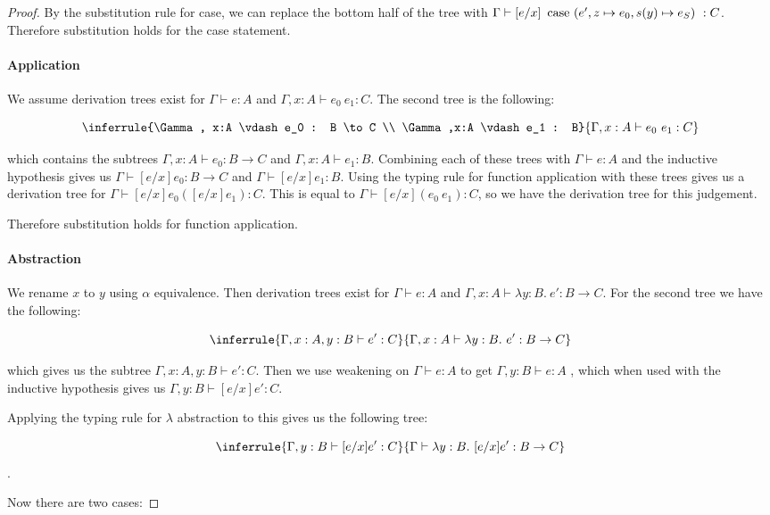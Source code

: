 \begin{proof}
By the substitution rule for case, we can replace the bottom half of the tree with $\Gamma \vdash [e/x] \ \operatorname{case} \ (e', z \mapsto e_0 , s(y) \mapsto e_S) \  : C$. Therefore substitution holds for the case statement. 

\paragraph{Application} We assume derivation trees exist for $\Gamma \vdash e : A$ and $\Gamma, x : A \vdash e_0 \ e_1 : C$. The second tree is the following:

$$
\inferrule{\Gamma , x:A \vdash e_0 : B \to C \\  \Gamma ,x:A \vdash e_1 : B}
  {\Gamma, x : A \vdash e_0 \ e_1 : C}$$

which contains the subtrees $\Gamma, x:A \vdash e_0 : B \to C$ and $\Gamma, x:A \vdash e_1 : B$. Combining each of these trees with $\Gamma \vdash e : A$ and the inductive hypothesis gives us $\Gamma \vdash [e/x]e_0 : B \to C$ and $\Gamma \vdash [e/x]e_1 : B$. Using the typing rule for function application with these trees gives us a derivation tree for $\Gamma \vdash [e/x]e_0 ([e/x]e_1) : C$. This is equal to $\Gamma \vdash [e/x](e_0 \ e_1) : C$, so we have the derivation tree for this judgement.

Therefore substitution holds for function application.

\paragraph{Abstraction} We rename $x$ to $y$ using $\alpha$ equivalence. Then derivation trees exist for $\Gamma \vdash e : A$ and $\Gamma, x : A \vdash \lambda y : B. \ e' : B \to C$. For the second tree we have the following:

$$\inferrule{\Gamma, x : A, y : B \vdash e' : C}{\Gamma, x:A \vdash \lambda y:B. \ e' : B \to C}$$

which gives us the subtree $\Gamma, x : A, y : B \vdash e' : C$. Then we use weakening on $\Gamma \vdash e : A$ to get $\Gamma, y : B \vdash e : A$
, which when used with the inductive hypothesis gives us $\Gamma, y : B \vdash [e/x]e' : C$. 


Applying the typing rule for $\lambda$ abstraction to this gives us the following tree:

$$\inferrule{\Gamma, y : B \vdash [e/x]e' : C}{\Gamma \vdash \lambda y:B. \ [e/x]e' : B \to C}$$.

Now there are two cases:


\end{proof}
